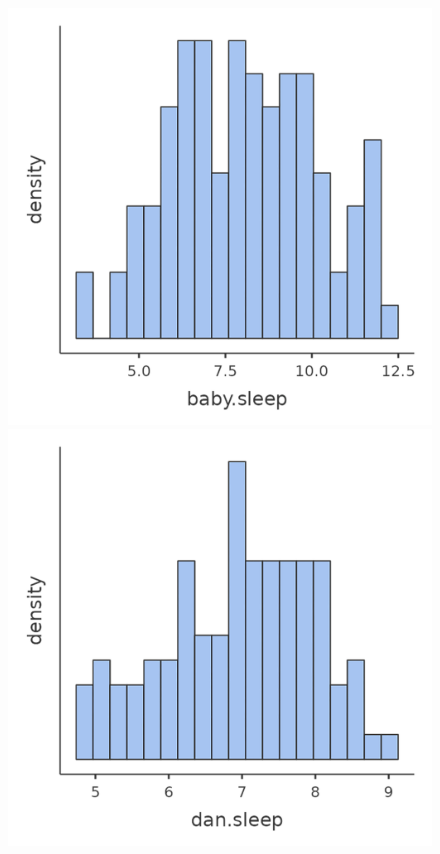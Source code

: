 \documentclass[
  a4paper,
]{book}
\begin{document}
\begin{figure}

\begin{minipage}[b]{0.33\linewidth}

{\centering 

\includegraphics{images/fig12-1a.png}

}

\subcaption{\label{fig-fig12-1a}}
\end{minipage}%
%
\begin{minipage}[b]{0.33\linewidth}

{\centering 

\includegraphics{images/fig12-1b.png}

}
\end{minipage}
\end{figure}
\end{document}
